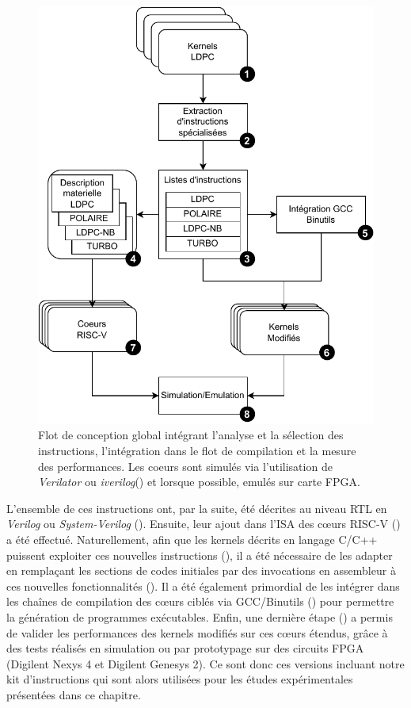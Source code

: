 \documentclass[../main.tex]{subfiles}
\begin{document}
\begin{figure}
\centering
\includegraphics[scale=1]{chapter3/figs/flot.pdf}
\caption{ Flot de conception global intégrant l'analyse et la sélection des instructions, l'intégration dans le flot de compilation et la mesure des performances.
Les coeurs sont simulés via l'utilisation de \textit{Verilator} ou \textit{iverilog}(\PicoRV) et lorsque possible, emulés sur carte FPGA.}
\label{flot}
\end{figure}

L'ensemble de ces instructions ont, par la suite, été décrites au niveau RTL en \textit{Verilog} ou \textit{System-Verilog} (). Ensuite, leur ajout dans l'ISA des cœurs RISC-V () \cite{ArchiRISC:V} a été effectué.
Naturellement, afin que les kernels décrits en langage C/C++ puissent exploiter ces nouvelles instructions (), il a été nécessaire de les adapter en remplaçant les sections de codes initiales par des invocations en assembleur à ces nouvelles fonctionnalités ().
Il a été également primordial de les intégrer dans les chaînes de compilation des cœurs ciblés via GCC/Binutils () pour permettre la génération de programmes exécutables.
Enfin, une dernière étape () a permis de valider les performances des kernels modifiés sur ces cœurs étendus, grâce à des tests réalisés en simulation ou par prototypage sur des circuits FPGA (Digilent Nexys 4 et Digilent Genesys 2).
Ce sont donc ces versions incluant notre kit d'instructions qui sont alors utilisées pour les études expérimentales présentées dans ce chapitre.
\end{document}
